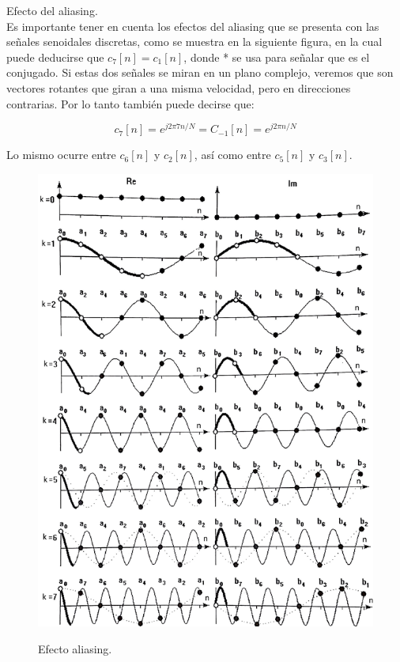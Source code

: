 Efecto del aliasing. \\

Es importante tener en cuenta los efectos del aliasing que se presenta con las señales senoidales discretas, como se muestra en la siguiente figura, en la cual puede deducirse que $c_{7}[n]=c_{1}[n]$, donde * se usa para señalar que es el conjugado. Si estas dos señales se miran en un plano complejo, veremos que son vectores rotantes que giran a una misma velocidad, pero en direcciones contrarias. Por lo tanto también puede decirse que:

\begin{equation} \label{capseis_diesiseis}
c_{7}[n]=e^{j2 \pi 7n/N}=C_{-1}[n]=e^{j2 \pi n/N}
\end{equation}

Lo mismo ocurre entre $c_{6}[n]$ y $c_{2}[n]$, así como entre $c_{5}[n]$ y $c_{3}[n]$.

\vspace{200px}
\begin{figure}[h!]
	\captionsetup{justification = raggedright, singlelinecheck = false}
	\caption{Efecto aliasing.} 
	\centering
	\includegraphics[scale=0.6]{Imagenes/Efecto-aliasing.png}
	\label{fig:Efecto-aliasing}
\end{figure}

